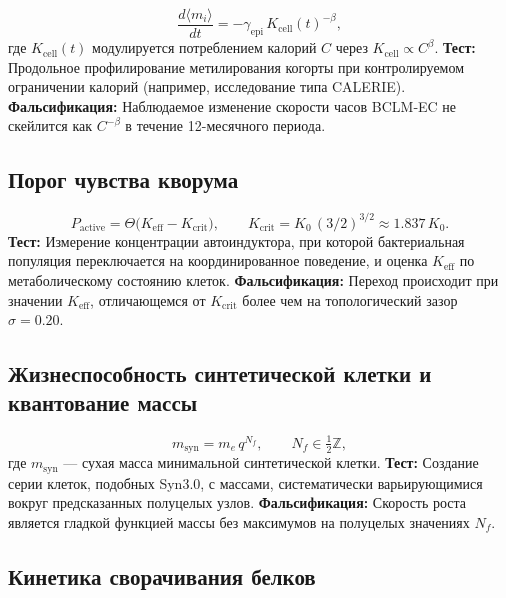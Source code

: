 \documentclass[11pt,a4paper]{article}
\begin{document}
	\begin{equation}\label{eq:pred-epi}
		\frac{d\langle m_i\rangle}{dt} =
		-\gamma_{\mathrm{epi}}\, K_{\mathrm{cell}}(t)^{-\beta},
	\end{equation}
	где \(K_{\mathrm{cell}}(t)\) модулируется потреблением калорий \(C\) через
	\(K_{\mathrm{cell}} \propto C^{\beta}\).
	\textbf{Тест:} Продольное профилирование метилирования когорты при контролируемом ограничении калорий (например, исследование типа CALERIE).
	\textbf{Фальсификация:} Наблюдаемое изменение скорости часов BCLM‑EC не скейлится как \(C^{-\beta}\) в течение 12-месячного периода.
	
	\subsection{Порог чувства кворума}
	
	\begin{equation}\label{eq:pred-qs}
		P_{\mathrm{active}} =
		\Theta\!\bigl(K_{\mathrm{eff}} - K_{\mathrm{crit}}\bigr),\qquad
		K_{\mathrm{crit}} = K_0\,(3/2)^{3/2} \approx 1.837\,K_0 .
	\end{equation}
	\textbf{Тест:} Измерение концентрации автоиндуктора, при которой бактериальная популяция переключается на координированное поведение, и оценка \(K_{\mathrm{eff}}\) по метаболическому состоянию клеток.
	\textbf{Фальсификация:} Переход происходит при значении \(K_{\mathrm{eff}}\), отличающемся от \(K_{\mathrm{crit}}\) более чем на топологический зазор \(\sigma=0.20\).
	
	\subsection{Жизнеспособность синтетической клетки и квантование массы}
	
	\begin{equation}\label{eq:pred-syn}
		m_{\mathrm{syn}} = m_e\,q^{N_f},\qquad N_f\in\tfrac12\mathbb{Z},
	\end{equation}
	где \(m_{\mathrm{syn}}\) — сухая масса минимальной синтетической клетки.
	\textbf{Тест:} Создание серии клеток, подобных Syn3.0, с массами, систематически варьирующимися вокруг предсказанных полуцелых узлов.
	\textbf{Фальсификация:} Скорость роста является гладкой функцией массы без максимумов на полуцелых значениях \(N_f\).
	
	\subsection{Кинетика сворачивания белков}
	
\end{document}
